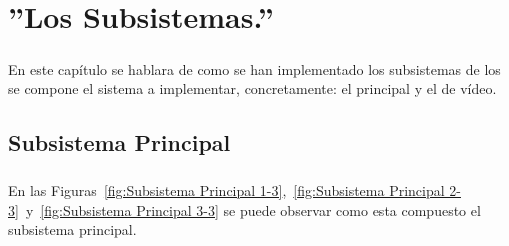 \documentclass[a4paper,12pt,titlepage,final]{book}
\begin{document}
\chapter{''Los Subsistemas.''}
\subsection*{}
\subsubsection*{}

\paragraph{}
En este capítulo se hablara de como se han implementado los subsistemas de los se compone el sistema a implementar, concretamente: el principal y el de vídeo. 

\section{Subsistema Principal}
\subsection*{}
\subsubsection*{}

\paragraph{}
En las Figuras~\ref{fig:Subsistema Principal 1-3},~\ref{fig:Subsistema Principal 2-3}~y~\ref{fig:Subsistema Principal 3-3} se puede observar como esta compuesto el subsistema principal.
\end{document}
